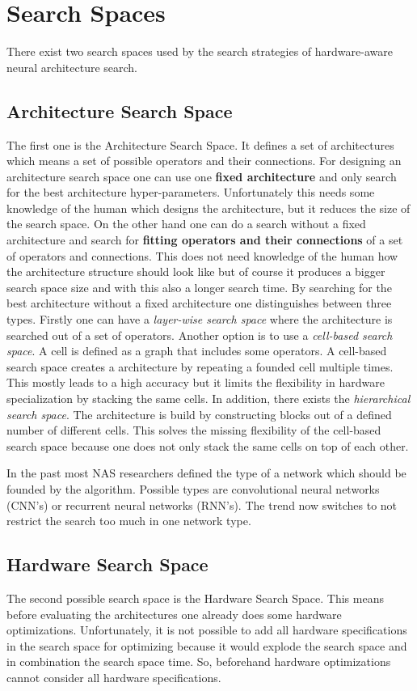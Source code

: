 \documentclass[conference]{IEEEtran}
\begin{document}
\section{Search Spaces}
\label{section:SearchSpaces}
There exist two search spaces used by the search strategies of hardware-aware neural architecture search. 

\subsection{Architecture Search Space}
The first one is the Architecture Search Space. It defines a set of architectures which means a set of possible operators and their connections. For designing an architecture search space one can use one \textbf{fixed architecture} and only search for the best architecture hyper-parameters. Unfortunately this needs some knowledge of the human which designs the architecture, but it reduces the size of the search space. On the other hand one can do a search without a fixed architecture and search for \textbf{fitting operators and their connections} of a set of operators and connections. This does not need knowledge of the human how the architecture structure should look like but of course it produces a bigger search space size and with this also a longer search time. By searching for the best architecture without a fixed architecture one distinguishes between three types. Firstly one can have a \textit{layer-wise search space} where the architecture is searched out of a set of operators. Another option is to use a \textit{cell-based search space}. A cell is defined as a graph that includes some operators. A cell-based search space creates a architecture by repeating a founded cell multiple times. This mostly leads to a high accuracy but it limits the flexibility in hardware specialization by stacking the same cells. In addition, there exists the \textit{hierarchical search space}. The architecture is build by constructing blocks out of a defined number of different cells. This solves the missing flexibility of the cell-based search space because one does not only stack the same cells on top of each other. 

In the past most NAS researchers defined the type of a network which should be founded by the algorithm. Possible types are convolutional neural networks (CNN's) or recurrent neural networks (RNN's). The trend now switches to not restrict the search too much in one network type. 

\subsection{Hardware Search Space}
The second possible search space is the Hardware Search Space. This means before evaluating the architectures one already does some hardware optimizations. Unfortunately, it is not possible to add all hardware specifications in the search space for optimizing because it would explode the search space and in combination the search space time. So, beforehand hardware optimizations cannot consider all hardware specifications.
\end{document}
